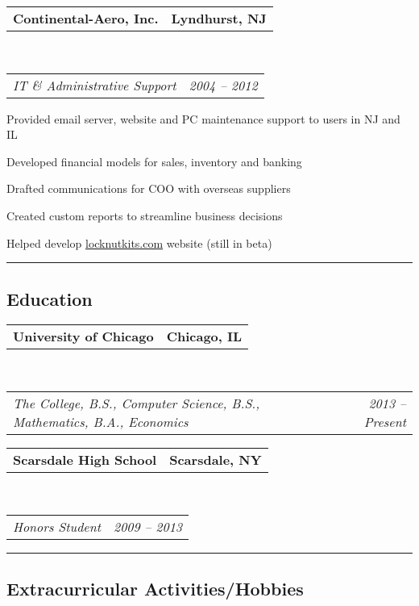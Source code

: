 \documentclass[10pt,letterpaper]{article}
\makeatletter
\newcommand{\headerrow}[2]
{\noindent \begin{tabular*}{\linewidth}{l@{\extracolsep{\fill}}r}
	#1 &
	#2 \\
\end{tabular*}}
\newcommand{\ahref}[1]
{\href{http://#1}{#1}}
\makeatother
\begin{document}
	\headerrow
		{\textbf{Continental-Aero, Inc.}}
		{\textbf{Lyndhurst, NJ}}
	\\
	\headerrow
		{\emph{IT \& Administrative Support}}
		{\emph{2004 -- 2012}}
	\begin{itemize*}
		\item Provided email server, website and PC maintenance support to users in NJ and IL
		\item Developed financial models for sales, inventory and banking
		\item Drafted communications for COO with overseas suppliers
		\item Created custom reports to streamline business decisions
		\item Helped develop \ahref{locknutkits.com} website (still in beta)
	\end{itemize*}


\vspace{0.4em}
\hrule
\vspace{-0.4em}
\subsection*{Education}

	\headerrow
		{\textbf{University of Chicago}}
		{\textbf{Chicago, IL}}
	\\
	\headerrow
		{\emph{The College, B.S., Computer Science, B.S., Mathematics, B.A., Economics}}
		{\emph{2013 -- Present}}

	\headerrow
		{\textbf{Scarsdale High School}}
		{\textbf{Scarsdale, NY}}
	\\
	\headerrow
		{\emph{Honors Student}}
		{\emph{2009 -- 2013}}

\vspace{0.8em}
\hrule
\vspace{-0.4em}
\subsection*{Extracurricular Activities/Hobbies}
\end{document}
